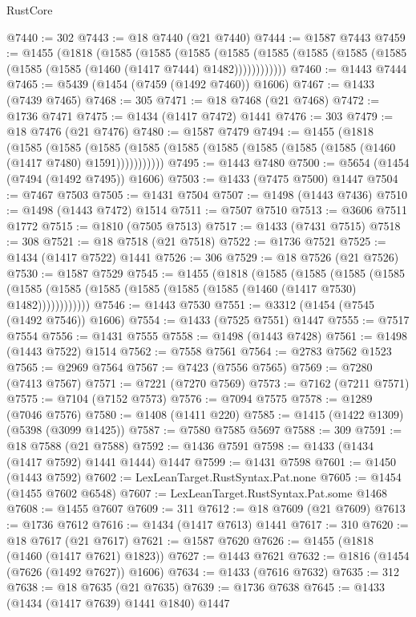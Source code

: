 \begin{lexlean}{RustCore}
\begin{coremodule}
@7440 := 302
@7443 := @18 @7440 (@21 @7440)
@7444 := @1587 @7443
@7459 := @1455
    (@1818
      (@1585
        (@1585
          (@1585
            (@1585 (@1585 (@1585 (@1585 (@1585 (@1585 (@1585 (@1460 (@1417 @7444) @1482))))))))))))
@7460 := @1443 @7444
@7465 := @5439 (@1454 (@7459 (@1492 @7460)) @1606)
@7467 := @1433 (@7439 @7465)
@7468 := 305
@7471 := @18 @7468 (@21 @7468)
@7472 := @1736 @7471
@7475 := @1434 (@1417 @7472) @1441
@7476 := 303
@7479 := @18 @7476 (@21 @7476)
@7480 := @1587 @7479
@7494 := @1455
    (@1818
      (@1585
        (@1585
          (@1585 (@1585 (@1585 (@1585 (@1585 (@1585 (@1585 (@1460 (@1417 @7480) @1591)))))))))))
@7495 := @1443 @7480
@7500 := @5654 (@1454 (@7494 (@1492 @7495)) @1606)
@7503 := @1433 (@7475 @7500) @1447
@7504 := @7467 @7503
@7505 := @1431 @7504
@7507 := @1498 (@1443 @7436)
@7510 := @1498 (@1443 @7472) @1514
@7511 := @7507 @7510
@7513 := @3606 @7511 @1772
@7515 := @1810 (@7505 @7513)
@7517 := @1433 (@7431 @7515)
@7518 := 308
@7521 := @18 @7518 (@21 @7518)
@7522 := @1736 @7521
@7525 := @1434 (@1417 @7522) @1441
@7526 := 306
@7529 := @18 @7526 (@21 @7526)
@7530 := @1587 @7529
@7545 := @1455
    (@1818
      (@1585
        (@1585
          (@1585
            (@1585 (@1585 (@1585 (@1585 (@1585 (@1585 (@1585 (@1460 (@1417 @7530) @1482))))))))))))
@7546 := @1443 @7530
@7551 := @3312 (@1454 (@7545 (@1492 @7546)) @1606)
@7554 := @1433 (@7525 @7551) @1447
@7555 := @7517 @7554
@7556 := @1431 @7555
@7558 := @1498 (@1443 @7428)
@7561 := @1498 (@1443 @7522) @1514
@7562 := @7558 @7561
@7564 := @2783 @7562 @1523
@7565 := @2969 @7564
@7567 := @7423 (@7556 @7565)
@7569 := @7280 (@7413 @7567)
@7571 := @7221 (@7270 @7569)
@7573 := @7162 (@7211 @7571)
@7575 := @7104 (@7152 @7573)
@7576 := @7094 @7575
@7578 := @1289 (@7046 @7576)
@7580 := @1408 (@1411 @220)
@7585 := @1415 (@1422 @1309) (@5398 (@3099 @1425))
@7587 := @7580 @7585 @5697
@7588 := 309
@7591 := @18 @7588 (@21 @7588)
@7592 := @1436 @7591
@7598 := @1433 (@1434 (@1417 @7592) @1441 @1444) @1447
@7599 := @1431 @7598
@7601 := @1450 (@1443 @7592)
@7602 := LexLeanTarget.RustSyntax.Pat.none
@7605 := @1454 (@1455 @7602 @6548)
@7607 := LexLeanTarget.RustSyntax.Pat.some @1468
@7608 := @1455 @7607
@7609 := 311
@7612 := @18 @7609 (@21 @7609)
@7613 := @1736 @7612
@7616 := @1434 (@1417 @7613) @1441
@7617 := 310
@7620 := @18 @7617 (@21 @7617)
@7621 := @1587 @7620
@7626 := @1455 (@1818 (@1460 (@1417 @7621) @1823))
@7627 := @1443 @7621
@7632 := @1816 (@1454 (@7626 (@1492 @7627)) @1606)
@7634 := @1433 (@7616 @7632)
@7635 := 312
@7638 := @18 @7635 (@21 @7635)
@7639 := @1736 @7638
@7645 := @1433 (@1434 (@1417 @7639) @1441 @1840) @1447

\end{coremodule}
\end{lexlean}
